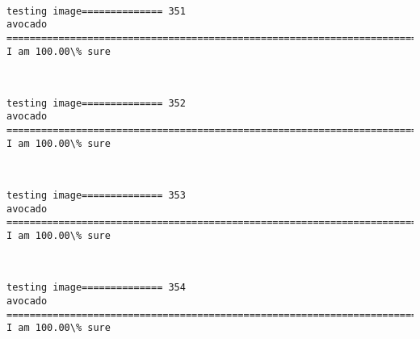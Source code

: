 \documentclass[11pt]{article}
\begin{document}
    \begin{center}
    \end{center}
    { \hspace*{\fill} \\}
    
    \begin{Verbatim}[commandchars=\\\{\}]
testing image============== 351
avocado
============================================================================
I am 100.00\% sure

    \end{Verbatim}

    \begin{center}
    \end{center}
    { \hspace*{\fill} \\}
    
    \begin{Verbatim}[commandchars=\\\{\}]
testing image============== 352
avocado
============================================================================
I am 100.00\% sure

    \end{Verbatim}

    \begin{center}
    \end{center}
    { \hspace*{\fill} \\}
    
    \begin{Verbatim}[commandchars=\\\{\}]
testing image============== 353
avocado
============================================================================
I am 100.00\% sure

    \end{Verbatim}

    \begin{center}
    \end{center}
    { \hspace*{\fill} \\}
    
    \begin{Verbatim}[commandchars=\\\{\}]
testing image============== 354
avocado
============================================================================
I am 100.00\% sure

    \end{Verbatim}
\end{document}
